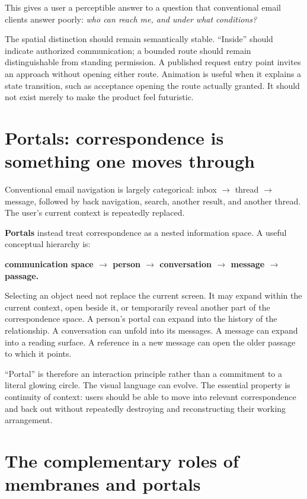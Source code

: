 \documentclass[11pt]{article}
\newcommand{\term}[1]{\textbf{#1}}
\begin{document}
This gives a user a perceptible answer to a question that conventional email clients answer poorly: \emph{who can reach me, and under what conditions?}

The spatial distinction should remain semantically stable. ``Inside'' should indicate authorized communication; a bounded route should remain distinguishable from standing permission. A published request entry point invites an approach without opening either route. Animation is useful when it explains a state transition, such as acceptance opening the route actually granted. It should not exist merely to make the product feel futuristic.

\section{Portals: correspondence is something one moves through}

Conventional email navigation is largely categorical: inbox $\rightarrow$ thread $\rightarrow$ message, followed by back navigation, search, another result, and another thread. The user's current context is repeatedly replaced.

\term{Portals} instead treat correspondence as a nested information space. A useful conceptual hierarchy is:

\begin{center}
\textbf{communication space $\rightarrow$ person $\rightarrow$ conversation $\rightarrow$ message $\rightarrow$ passage.}
\end{center}

Selecting an object need not replace the current screen. It may expand within the current context, open beside it, or temporarily reveal another part of the correspondence space. A person's portal can expand into the history of the relationship. A conversation can unfold into its messages. A message can expand into a reading surface. A reference in a new message can open the older passage to which it points.

``Portal'' is therefore an interaction principle rather than a commitment to a literal glowing circle. The visual language can evolve. The essential property is continuity of context: users should be able to move into relevant correspondence and back out without repeatedly destroying and reconstructing their working arrangement.

\section{The complementary roles of membranes and portals}
\end{document}
